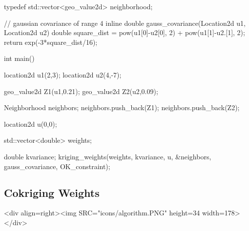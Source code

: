 \documentclass[12pt,twoside]{report}
\begin{document}
\begin{code}
typedef std::vector<geo_value2d> neighborhood;

// gaussian covariance of range 4
inline double gauss_covariance(Location2d u1, Location2d u2){
  double square_dist = pow(u1[0]-u2[0], 2) +
                       pow(u1[1]-u2.[1], 2);
  return exp(-3*square_dist/16);                     
}


int main()
{  
  location2d u1(2,3);
  location2d u2(4,-7);

  geo_value2d Z1(u1,0.21);
  geo_value2d Z2(u2,0.09); 
  
  Neighborhood neighbors;
  neighbors.push_back(Z1);
  neighbors.push_back(Z2);

  location2d u(0,0);

  std::vector<double> weights;

  double kvariance;
  kriging_weights(weights, kvariance,
                  u, &neighbors,
                  gauss_covariance, OK_constraint);
}

\end{code}








 
\subsection{Cokriging Weights}
\label{cokriging}
\begin{htmlonly}
<div align=right><img SRC="icons/algorithm.PNG" height=34 width=178></div>
\end{htmlonly}
\end{document}

